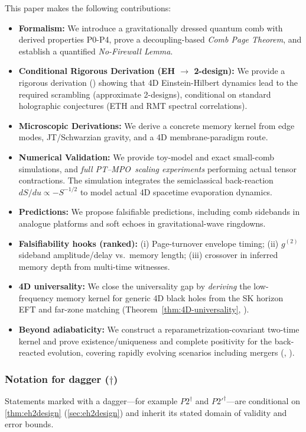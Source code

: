 \documentclass[aps,prd,preprint,onecolumn,superscriptaddress,nofootinbib,longbibliography,floatfix,11pt,showpacs,showkeys]{revtex4-2}
\newcommand{\ptmpo}{PT--MPO}
\theoremstyle{plain}
\theoremstyle{definition}
\theoremstyle{remark}
\begin{document}
This paper makes the following contributions:
\begin{itemize}[leftmargin=*]
    \item \textbf{Formalism:} We introduce a gravitationally dressed quantum comb with derived properties P0-P4, prove a decoupling-based \emph{Comb Page Theorem}, and establish a quantified \emph{No-Firewall Lemma}.
    \item \textbf{Conditional Rigorous Derivation (EH $\to$ 2-design):} We provide a rigorous derivation () showing that 4D Einstein-Hilbert dynamics lead to the required scrambling (approximate 2-designs), conditional on standard holographic conjectures (ETH and RMT spectral correlations).
    \item \textbf{Microscopic Derivations:} We derive a concrete memory kernel from edge modes, JT/Schwarzian gravity, and a 4D membrane-paradigm route.
    \item \textbf{Numerical Validation:} We provide toy-model and exact
        small-comb simulations, and \emph{full \ptmpo\ scaling experiments}
        performing actual tensor contractions. The simulation integrates the 
        semiclassical back-reaction $dS/du \propto -S^{-1/2}$ to model 
        actual 4D spacetime evaporation dynamics.
    \item \textbf{Predictions:} We propose falsifiable predictions, including comb sidebands in analogue platforms and soft echoes in gravitational-wave ringdowns.
  \item \textbf{Falsifiability hooks (ranked):} (i) Page-turnover envelope timing;
        (ii) $g^{(2)}$ sideband amplitude/delay vs.\ memory length; (iii) crossover
        in inferred memory depth from multi-time witnesses.
  \item \textbf{4D universality:} We close the universality gap by \emph{deriving} the low-frequency memory kernel for generic 4D black holes from the SK horizon EFT and far-zone matching (Theorem~\ref{thm:4D-universality}, ).
  \item \textbf{Beyond adiabaticity:} We construct a reparametrization-covariant two-time kernel and prove existence/uniqueness and complete positivity for the back-reacted evolution, covering rapidly evolving scenarios including mergers (, ).
\end{itemize}

\subsubsection{Notation for dagger ($\dagger$)}
Statements marked with a dagger---for example $P2^\dagger$ and $P2'^\dagger$---are conditional on \cref{thm:eh2design} (\cref{sec:eh2design}) and inherit its stated domain of validity and error bounds.
\end{document}
